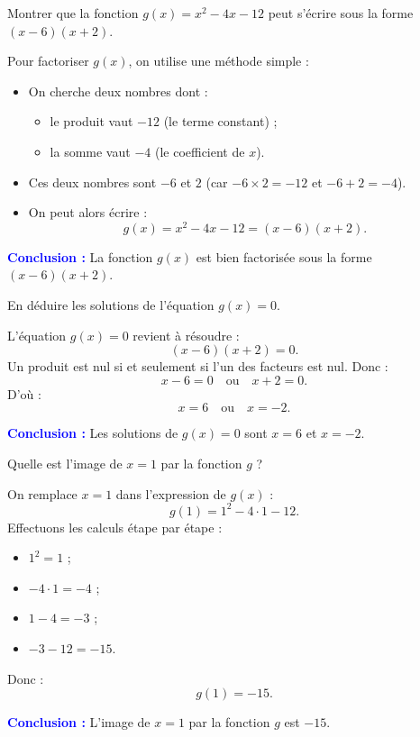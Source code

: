\documentclass{exam}
\begin{document}
\begin{questions}
\question[2] Montrer que la fonction \(g(x) = x^2 - 4x - 12\) peut s'écrire sous la forme \((x-6)(x+2)\).

Pour factoriser \(g(x)\), on utilise une méthode simple :
\begin{itemize}[noitemsep]
    \item On cherche deux nombres dont :
        \begin{itemize}[noitemsep]
            \item le produit vaut \(-12\) (le terme constant) ;
            \item la somme vaut \(-4\) (le coefficient de \(x\)).
        \end{itemize}
    \item Ces deux nombres sont \(-6\) et \(2\) (car \(-6 \times 2 = -12\) et \(-6 + 2 = -4\)).
    \item On peut alors écrire :
    \[
    g(x) = x^2 - 4x - 12 = (x - 6)(x + 2).
    \]
\end{itemize}

\textbf{\textcolor{blue}{Conclusion :}} La fonction \(g(x)\) est bien factorisée sous la forme \((x - 6)(x + 2)\).

\question[0.5] En déduire les solutions de l'équation \(g(x) = 0\).

L'équation \(g(x) = 0\) revient à résoudre :
\[
(x - 6)(x + 2) = 0.
\]
Un produit est nul si et seulement si l'un des facteurs est nul. Donc :
\[
x - 6 = 0 \quad \text{ou} \quad x + 2 = 0.
\]
D'où :
\[
x = 6 \quad \text{ou} \quad x = -2.
\]

\textbf{\textcolor{blue}{Conclusion :}} Les solutions de \(g(x) = 0\) sont \(x = 6\) et \(x = -2\).

\question[0.5] Quelle est l'image de \(x = 1\) par la fonction \(g\) ?

On remplace \(x = 1\) dans l'expression de \(g(x)\) :
\[
g(1) = 1^2 - 4 \cdot 1 - 12.
\]
Effectuons les calculs étape par étape :
\begin{itemize}[noitemsep]
    \item \(1^2 = 1\) ;
    \item \(-4 \cdot 1 = -4\) ;
    \item \(1 - 4 = -3\) ;
    \item \(-3 - 12 = -15\).
\end{itemize}
Donc :
\[
g(1) = -15.
\]

\textbf{\textcolor{blue}{Conclusion :}} L'image de \(x = 1\) par la fonction \(g\) est \(-15\).


\end{questions}
\end{document}
